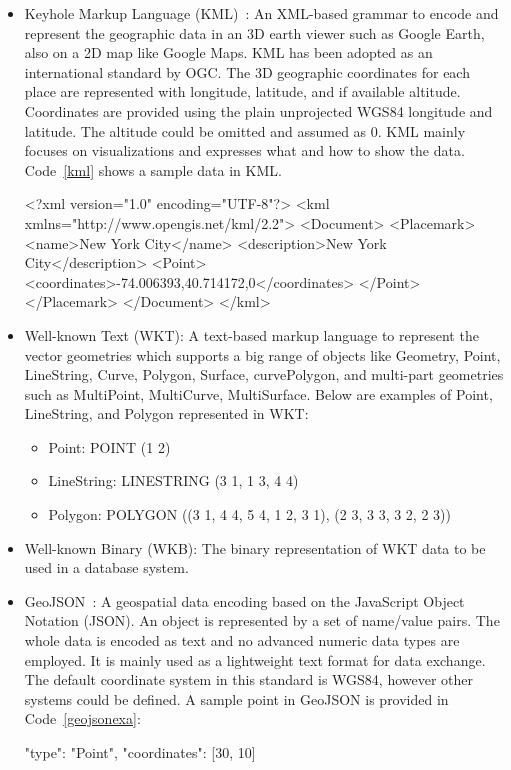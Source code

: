 \documentclass[a4paper,12pt]{article}
\begin{document}
\begin{itemize}
\item Keyhole Markup Language (KML)~\cite{kml}: An XML-based grammar to encode and represent the geographic data in an 3D earth viewer such as Google Earth, also on a 2D map like Google Maps. KML has been adopted as an inter\-national standard by OGC. The 3D geographic coordinates for each place are represented with longitude, latitude, and if available altitude. Coordinates are provided using the plain unprojected WGS84 longitude and latitude. The altitude could be omitted and assumed as $0$. KML mainly focuses on visualizations and expresses what and how to show the data. Code~\ref{kml} shows a sample data in KML. 
\vspace{10px}
\begin{fakeXML}[label=kml,caption=A simple KML example representing a Point]
<?xml version="1.0" encoding="UTF-8"?>
<kml xmlns="http://www.opengis.net/kml/2.2">
<Document>
<Placemark>
  <name>New York City</name>
  <description>New York City</description>
  <Point>
    <coordinates>-74.006393,40.714172,0</coordinates>
  </Point>
</Placemark>
</Document>
</kml>
\end{fakeXML} 
\vspace{10px}
\item Well-known Text (WKT): A text-based markup language to represent the vector geometries which supports a big range of objects like Geometry, Point, LineString, Curve, Polygon, Surface, curvePolygon, and multi-part geometries such as MultiPoint, MultiCurve, MultiSurface. Below are examples of Point, LineString, and Polygon represented in WKT: 
\begin{itemize}
\item Point: POINT (1 2)
\item LineString: LINESTRING (3 1, 1 3, 4 4)
\item Polygon: POLYGON ((3 1, 4 4, 5 4, 1 2, 3 1),
			(2 3, 3 3, 3 2, 2 3))
\end{itemize}
\item Well-known Binary (WKB): The binary representation of WKT data to be used in a database system.
\item GeoJSON~\cite{www/geojson}: A geospatial data encoding based on the JavaScript Object Notation (JSON). An object is represented by a set of name/value pairs. The whole data is encoded as text and no advanced numeric data types are employed. It is mainly used as a lightweight text format for data exchange. The default coordinate system in this standard is WGS84, however other systems could be defined. A sample point in GeoJSON is provided in Code~\ref{geojsonexa}:
\vspace{10px} 
\begin{fakeXML}[label=geojsonexa,caption=A simple GeoJSON example representing a Point]
{
    "type": "Point", 
    "coordinates": [30, 10]
}
\end{fakeXML}
\end{itemize}
\vspace{10px}
\end{document}
